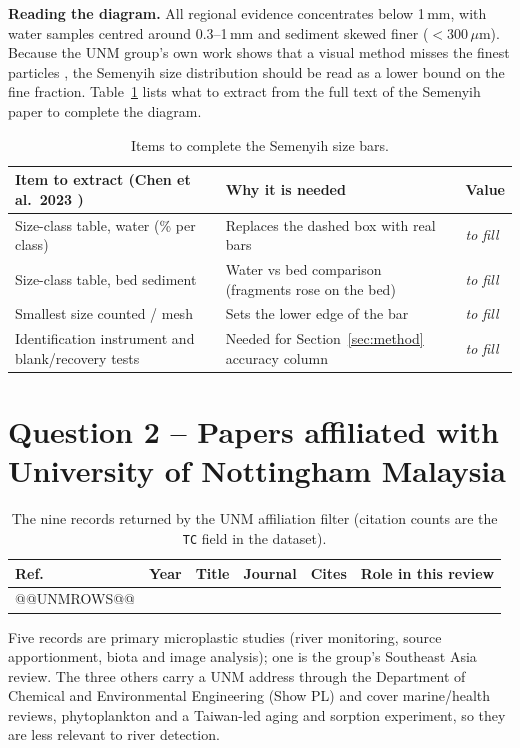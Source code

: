 \documentclass[11pt,a4paper]{article}
\newcommand{\um}{\,\ensuremath{\mu}m}
\begin{document}
\noindent\textbf{Reading the diagram.} All regional evidence concentrates below 1\,mm, with water samples centred around 0.3--1\,mm and sediment skewed finer ($<$300\um). Because the UNM group's own work shows that a visual method misses the finest particles \cite{ng24}, the Semenyih size distribution should be read as a lower bound on the fine fraction. Table~\ref{tab:fill} lists what to extract from the full text of the Semenyih paper to complete the diagram.

\begin{table}[H]\centering\small
\begin{tabularx}{\textwidth}{@{}lXl@{}}
\toprule Item to extract (Chen et al.\ 2023 \cite{chen23}) & Why it is needed & Value \\\midrule
Size-class table, water (\% per class) & Replaces the dashed box with real bars & \emph{to fill} \\
Size-class table, bed sediment & Water vs bed comparison (fragments rose on the bed) & \emph{to fill} \\
Smallest size counted / mesh & Sets the lower edge of the bar & \emph{to fill} \\
Identification instrument and blank/recovery tests & Needed for Section~\ref{sec:method} accuracy column & \emph{to fill} \\
\bottomrule\end{tabularx}
\caption{Items to complete the Semenyih size bars.}\label{tab:fill}
\end{table}

\section{Question 2 -- Papers affiliated with University of Nottingham Malaysia}
\begin{table}[H]\centering\scriptsize
\begin{tabularx}{\textwidth}{@{}p{1.1cm}p{0.8cm}Xp{3.0cm}p{0.8cm}p{2.4cm}@{}}
\toprule Ref. & Year & Title & Journal & Cites & Role in this review \\\midrule
@@UNMROWS@@
\bottomrule\end{tabularx}
\caption{The nine records returned by the UNM affiliation filter (citation counts are the \texttt{TC} field in the dataset).}
\end{table}
Five records are primary microplastic studies (river monitoring, source apportionment, biota and image analysis); one is the group's Southeast Asia review. The three others carry a UNM address through the Department of Chemical and Environmental Engineering (Show PL) and cover marine/health reviews, phytoplankton and a Taiwan-led aging and sorption experiment, so they are less relevant to river detection.
\end{document}
